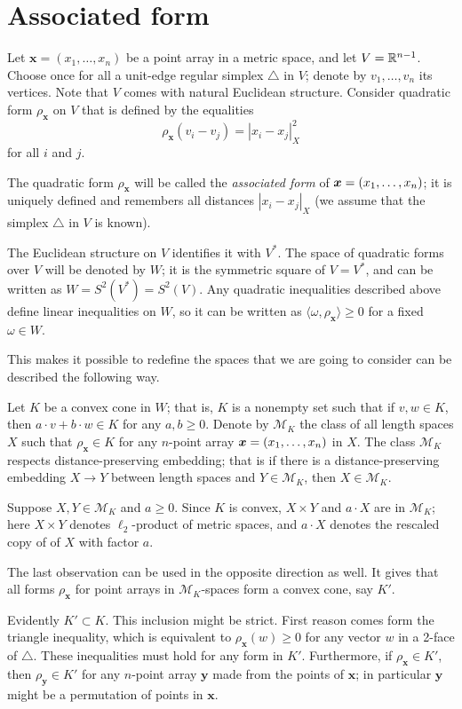 \documentclass[a4paper,10pt]{article}
\begin{document}
\section{Associated form}\label{Associated form}
Let $\bm{x}=(x_1,\dots,x_n)$ be a point array in a metric space, and let $V\z=\RR^{n-1}$.
Choose once for all a unit-edge regular simplex $\triangle$ in $V$; denote by $v_1,\dots,v_n$ its vertices.
Note that $V$ comes with natural Euclidean structure.
Consider quadratic form $\rho_{\bm{x}}$ on $V$ that is defined by the equalities
\[\rho_{\bm{x}}(v_i-v_j)=|x_i-x_j|^2_X\] 
for all $i$ and $j$.

The quadratic form $\rho_{\bm{x}}$ will be called the \emph{associated form} of $\bm{x}=(x_1,\z\dots,x_n)$;
it is uniquely defined and remembers all distances $|x_i-x_j|_X$
(we assume that the simplex $\triangle$ in $V$ is known).

The Euclidean structure on $V$ identifies it with $V^*$.
The space of quadratic forms over $V$ will be denoted by $W$;
it is the symmetric square of $V=V^*$, and can be written as $W=S^2(V^*)=S^2(V)$.
Any quadratic inequalities described above define linear inequalities on $W$, so it can be written as $\langle\omega,\rho_{\bm{x}}\rangle\ge 0$ for a fixed $\omega\in W$.

This makes it possible to redefine the spaces that we are going to consider can be described the following way.

Let $K$ be a convex cone in $W$;
that is, $K$ is a nonempty set such that if $v,w\in K$, then $a\cdot v+b\cdot w\in K$ for any $a,b\ge0$.
Denote by $\mathcal{M}_K$ the class of all length spaces $X$ such that
$\rho_{\bm{x}}\in K$ for any $n$-point array $\bm{x}\z=(x_1,\dots,x_n)$ in $X$.
The class $\mathcal{M}_K$ respects distance-preserving embedding; that is
if there is a distance-preserving embedding $X\to Y$ between length spaces and $Y \in  \mathcal{M}_K$, then $X\in \mathcal{M}_K$.

Suppose $X,Y\in  \mathcal{M}_K$ and $a\ge 0$.
Since $K$ is convex,  $X\times Y$ and $a\cdot X$ are in $\mathcal{M}_K$;
here $X\times Y$ denotes $\ell_2$-product of metric spaces, and 
$a\cdot X$ denotes the rescaled copy of of $X$ with factor $a$. 

The last observation can be used in the opposite direction as well.
It gives that all forms $\rho_{\bm{x}}$ for point arrays in $\mathcal{M}_K$-spaces form a convex cone, say $K'$.

Evidently $K'\subset K$.
This inclusion might be strict.
First reason comes form the triangle inequality, which is equivalent to $\rho_{\bm{x}}(w)\ge 0$ for any vector $w$ in a 2-face of $\triangle$.
These inequalities must hold for any form in $K'$.
Furthermore, if $\rho_{\bm{x}}\in K'$, then $\rho_{\bm{y}}\in K'$ for any $n$-point array $\bm{y}$ made from the points of $\bm{x}$; in particular $\bm{y}$ might be a permutation of points in $\bm{x}$.
\end{document}

